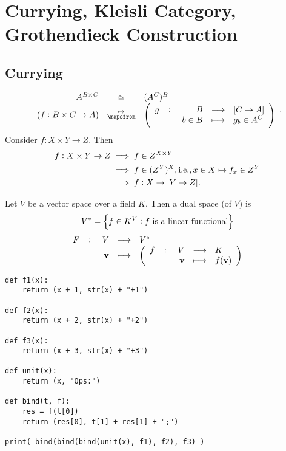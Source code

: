 \section{Currying, Kleisli Category, Grothendieck Construction}
\subsection{Currying}
\begin{note}
\[
\begin{array}{rcl}
	A^{B\times C}&\simeq &(A^C)^B \\
	(f:B\times C\to A)&\substack{\mapsto\\ \mapsfrom} &\left(\fullfunction{g}{B}{[C\to A]}{b\in B}{g_b\in A^C}\right)
\end{array}.
\] Consider $f:X\times Y\to Z$. Then\begin{align*}
	f:X\times Y\to Z&\implies f\in Z^{X\times Y} \\
	&\implies f\in (Z^{Y})^X, \textnormal{i.e.}, x\in X\mapsto f_x\in Z^Y \\
	&\implies f:X\to[Y\to Z].
\end{align*}
\end{note}
Let $V$ be a vector space over a field $K$. Then a dual space (of $V$) is \[
V^*=\set{f\in K^V:f\ \text{is a linear functional}}
\] \[
\fullfunction{F}{V}{V^*}{\textbf{v}}{
	\left(\fullfunction{f}{V}{K}{\textbf{v}}{f(\textbf{v})}\right)
}
\]

\begin{lstlisting}
def f1(x):
	return (x + 1, str(x) + "+1")

def f2(x):
	return (x + 2, str(x) + "+2")

def f3(x):
	return (x + 3, str(x) + "+3")

def unit(x):
	return (x, "Ops:")
	
def bind(t, f):
	res = f(t[0])
	return (res[0], t[1] + res[1] + ";")
	
print( bind(bind(bind(unit(x), f1), f2), f3) )
\end{lstlisting}


\newpage